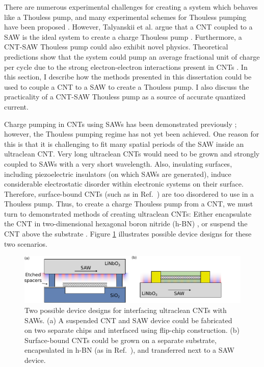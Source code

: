 \documentclass[double,12pt,1in,seploa]{beavtex}
\begin{document}
There are numerous experimental challenges for creating a system which behaves like a Thouless pump, and many experimental schemes for Thouless pumping have been proposed \cite{citro_thouless_2023}. However, Talyanskii et al. argue that a CNT coupled to a SAW is the ideal system to create a charge Thouless pump \cite{talyanskii_quantized_2001}. Furthermore, a CNT-SAW Thouless pump could also exhibit novel physics. Theoretical predictions show that the system could pump an average fractional unit of charge per cycle due to the strong electron-electron interactions present in CNTs \cite{novikov_devils_2005}. In this section, I describe how the methods presented in this dissertation could be used to couple a CNT to a SAW to create a Thouless pump. I also discuss the practicality of a CNT-SAW Thouless pump as a source of accurate quantized current.

Charge pumping in CNTs using SAWs has been demonstrated previously \cite{buitelaar_adiabatic_2008}; however, the Thouless pumping regime has not yet been achieved. One reason for this is that it is challenging to fit many spatial periods of the SAW inside an ultraclean CNT. Very long ultraclean CNTs would need to be grown and strongly coupled to SAWs with a very short wavelength. Also, insulating surfaces, including piezoelectric insulators (on which SAWs are generated), induce considerable electrostatic disorder within electronic systems on their surface. Therefore, surface-bound CNTs (such as in Ref.\ \cite{buitelaar_adiabatic_2008}) are too disordered to use in a Thouless pump. Thus, to create a charge Thouless pump from a CNT, we must turn to demonstrated methods of creating ultraclean CNTs: Either encapsulate the CNT in two-dimensional hexagonal boron nitride (h-BN) \cite{huang_superior_2015}, or suspend the CNT above the substrate \cite{senger_universal_2018}. Figure \ref{Thouless pump designs} illustrates possible device designs for these two scenarios.


\begin{figure}
    \includegraphics{Intro thouless pump designs.pdf}
    \caption{Two possible device designs for interfacing ultraclean CNTs with SAWs. (a) A suspended CNT and SAW device could be fabricated on two separate chips and interfaced using flip-chip construction. (b) Surface-bound CNTs could be grown on a separate substrate, encapsulated in h-BN (as in Ref.\ \cite{huang_superior_2015}), and transferred next to a SAW device.}
    \label{Thouless pump designs}
\end{figure}
\end{document}
